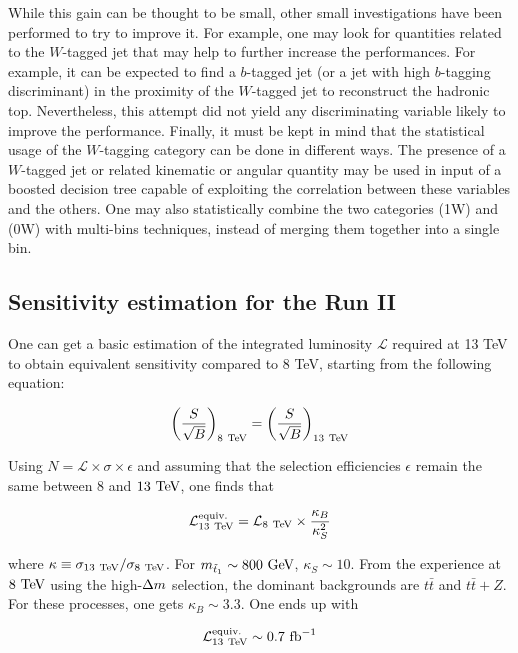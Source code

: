         While this gain can be thought to be small, other small investigations have been
        performed to try to improve it.
        For example, one may look for quantities related to the $W$-tagged jet that may help to further
        increase the performances. For example, it can be expected to find a $b$-tagged
        jet (or a jet with high $b$-tagging discriminant) in the proximity of the $W$-tagged
        jet to reconstruct the hadronic top. Nevertheless, this attempt did not yield
        any discriminating variable likely to improve the performance.
        Finally, it must be kept in mind that the statistical usage of the $W$-tagging
        category can be done in different ways. The presence of a $W$-tagged jet or
        related kinematic or angular quantity may be used in input of a boosted decision
        tree capable of exploiting the correlation between these variables and the others.
        One may also statistically combine the two categories (1W) and (0W) with multi-bins
        techniques, instead of merging them together into a single bin.

        \subsection{Sensitivity estimation for the Run II}

        One can get a basic estimation of the integrated luminosity $\mathcal{L}$ required
        at 13 TeV to obtain equivalent sensitivity compared to 8 TeV, starting from the
        following equation:

        $$ \left( \frac{S}{\sqrt{B}} \right)_{8~\text{TeV}} = \left( \frac{S}{\sqrt{B}} \right)_{13~\text{TeV}}  $$

        Using $N = \mathcal{L} \times \sigma \times \epsilon$ and assuming that the selection
        efficiencies $\epsilon$ remain the same between $8$ and $13~\text{TeV}$, one finds that

        $$ \mathcal{L}^\text{equiv.}_{13~\text{TeV}} = \mathcal{L}_{8~\text{TeV}} \times \frac{\kappa_B}{\kappa^2_S} $$

        where $\kappa \equiv \sigma_{13~\text{TeV}} / \sigma_{8~\text{TeV}}$. For $m_{\tilde{t}_1} \sim 800~\text{GeV}$,
        $\kappa_S \sim 10$. From the experience at $8~\text{TeV}$ using the high-$\Delta m$ selection,
        the dominant backgrounds are $t\bar{t}$ and $t\bar{t}+Z$. For these processes, one
        gets $\kappa_B \sim 3.3$. One ends up with

        $$ \mathcal{L}^\text{equiv.}_{13~\text{TeV}} \sim 0.7~\text{fb}^{-1}$$

